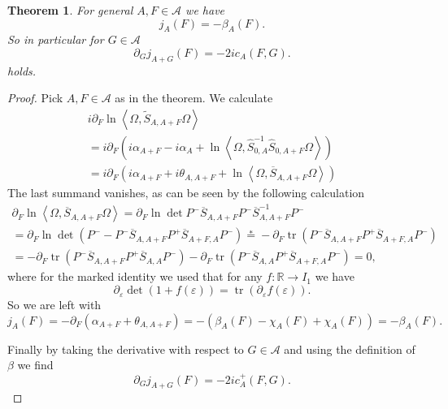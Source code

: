 \documentclass[a4paper,11pt]{article}
\newtheorem{thm}{Theorem}
\DeclareMathOperator{\tr}{tr}
\begin{document}
\begin{thm}
For general \(A,F\in\mathcal{A}\) we have
\begin{equation}
j_A(F)=-\beta_A(F).
\end{equation}
So in particular for \(G\in\mathcal{A}\)
\begin{equation}
\partial_G j_{A+G}(F)=-2i c_A(F,G).
\end{equation}
holds.
\end{thm}
\begin{proof}
Pick \(A,F\in\mathcal{A}\) as in the theorem. We calculate
\begin{align}
i\partial_F \ln \left\langle\Omega, \tilde{S}_{A,A+F}\Omega\right\rangle\\
=i\partial_F\left( i\alpha_{A+F}-i\alpha_A + \ln \left\langle\Omega, \hat{S}_{0,A}^{-1} \hat{S}_{0,A+F}\Omega\right\rangle\right)\\
=i\partial_F\left( i\alpha_{A+F}+i\theta_{A,A+F} + \ln \left\langle\Omega, \overline{S}_{A,A+F}\Omega\right\rangle\right)
\end{align}
The last summand vanishes, as can be seen by the following calculation
\begin{align}
\partial_{F} \ln \left\langle \Omega, \overline{S}_{A,A+F}\Omega\right\rangle
=\partial_{F} \ln \det P^-\overline{S}_{A,A+F}P^-\overline{S}_{A,A+F}^{-1}P^- \\
=\partial_{F} \ln \det(P^-- P^-\overline{S}_{A,A+F}P^+\overline{S}_{A+F,A}P^-)
\overset{*}{=}-\partial_{F}\tr (P^-\overline{S}_{A,A+F}P^+\overline{S}_{A+F,A}P^-)\\
=-\partial_{F}\tr (P^-\overline{S}_{A,A+F}P^+\overline{S}_{A,A}P^-)-\partial_{F}\tr (P^-\overline{S}_{A,A}P^+\overline{S}_{A+F,A}P^-)=0,
\end{align}
where for the marked identity we used that for any \(f:\mathbb{R}\rightarrow I_1\) we have
\begin{equation}
\partial_{\varepsilon} \det (1+ f(\varepsilon))=\tr(\partial_{\varepsilon}f(\varepsilon)).
\end{equation}
So we are left with
\begin{equation}
j_A(F)=-\partial_F (\alpha_{A+F}+\theta_{A,A+F})=-(\beta_A(F)-\chi_A(F)+\chi_A(F))=-\beta_A(F).
\end{equation}

Finally by taking the derivative with respect to \(G\in\mathcal{A}\) and using the definition of \(\beta\) we find
\begin{equation}
\partial_G j_{A+G}(F)=-2i c_A^+(F,G).
\end{equation}


\end{proof}




\end{document}

